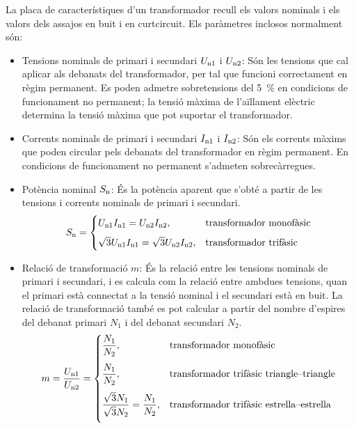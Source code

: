 La  placa de característiques d'un transformador recull els valors nominals  i els valors dels assajos
en buit i en curtcircuit. Els paràmetres inclosos normalment són:
\begin{itemize}
   \item Tensions nominals de primari i secundari  $U_\mathrm{n1}$ i $U_\mathrm{n2}$: Són les tensions que cal aplicar als debanats del transformador, per tal que funcioni correctament en règim permanent. Es poden admetre sobretensions del \qty{5}{\percent} en condicions de funcionament no permanent; la tensió màxima de l'aïllament elèctric determina la tensió màxima que pot suportar el transformador.
   \item Corrents nominals de primari i secundari  $I_\mathrm{n1}$ i $I_\mathrm{n2}$: Són els corrents màxims que poden circular pels debanats del transformador en règim permanent. En condicions de funcionament no permanent s'admeten sobrecàrregues.
   \item Potència nominal $S_\mathrm{n}$: És la potència aparent que s'obté a partir de les tensions i corrents nominals de primari i secundari.
       \begin{equation}
        S_\mathrm{n} = \begin{cases} U_\mathrm{n1} I_\mathrm{n1} = U_\mathrm{n2} I_\mathrm{n2}, & \text{transformador monofàsic} \\[2mm]
        \sqrt{3} U_\mathrm{n1} I_\mathrm{n1} = \sqrt{3} U_\mathrm{n2} I_\mathrm{n2}, & \text{transformador trifàsic} \end{cases}
       \end{equation}
   \item Relació de transformació $m$: És la relació entre les tensions nominals de primari i secundari, i es calcula com la relació entre ambdues tensions, quan el primari està connectat a la tensió nominal i el secundari està en buit. La relació de  transformació també es pot calcular a partir del nombre d'espires del debanat primari $N_1$ i del debanat secundari $N_2$.
       \begin{equation}
        m = \frac{U_\mathrm{n1}}{U_\mathrm{n2}} =  \begin{cases}
        \dfrac{N_1}{N_2}, & \text{transformador monofàsic} \\[0.4cm]
        \dfrac{N_1}{N_2}, & \text{transformador trifàsic triangle--triangle} \\[0.4cm]
        \dfrac{\sqrt{3}N_1}{\sqrt{3}N_2} = \dfrac{N_1}{N_2}, & \text{transformador trifàsic estrella--estrella} \\[0.4cm]

\end{cases}
\end{equation}
\end{itemize}
